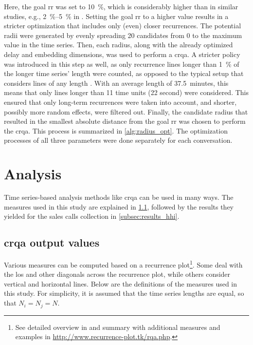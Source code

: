 Here, the goal \ac{rr} was set to \SI{10}{\percent}, which is considerably higher than in similar studies, e.g., \SIrange{2}{5}{\percent} in \citet{Coco2014crqa-r}.
Setting the goal \ac{rr} to a higher value results in a stricter optimization that includes only (even) closer recurrences.
The potential radii were generated by evenly spreading 20 candidates from 0 to the maximum value in the time series.
Then, each radius, along with the already optimized delay and embedding dimensions, was used to perform a \ac{crqa}.
A stricter policy was introduced in this step as well, as only recurrence lines longer than \SI{1}{\percent} of the longer time series' length were counted, as opposed to the typical setup that considers lines of any length \citep[e.g., as in ][]{Borrie2019syncing}.
With an average length of \SI{37.5}{minutes}, this means that only lines longer than 11 time units (22 second) were considered.
This ensured that only long-term recurrences were taken into account, and shorter, possibly more random effects, were filtered out.
Finally, the candidate radius that resulted in the smallest absolute distance from the goal \ac{rr} was chosen to perform the \ac{crqa}.
This process is summarized in \cref{alg:radius_opt}.
The optimization processes of all three parameters were done separately for each conversation.

\section{Analysis}
\label{sec:analysis_hhi}

Time series-based analysis methods like \ac{crqa} can be used in many ways.
The measures used in this study are explained in \cref{subsec:output_values}, followed by the results they yielded for the sales calls collection in \cref{subsec:results_hhi}.

\subsection{\Acs{crqa} output values}
\label{subsec:output_values}

Various measures can be computed based on a recurrence plot\footnote{See detailed overview in \citet{Marwan2007recurrence} and summary with additional measures and examples in \url{http://www.recurrence-plot.tk/rqa.php}.}.
Some deal with the \ac{los} and other diagonals across the recurrence plot, while others consider vertical and horizontal lines.
Below are the definitions of the measures used in this study.
For simplicity, it is assumed that the time series lengths are equal, so that $N_i=N_j=N$.

